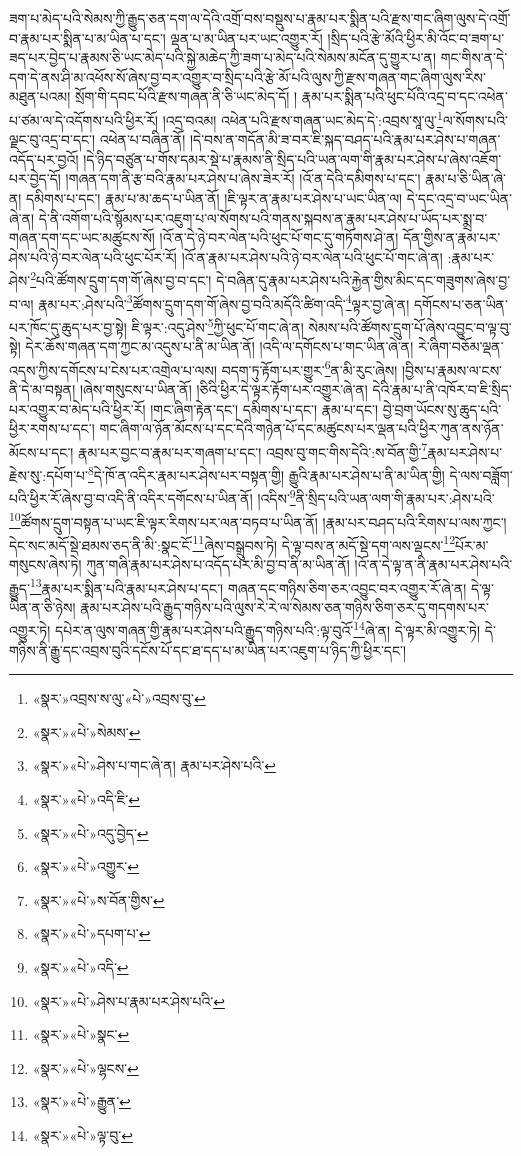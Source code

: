 ཟག་པ་མེད་པའི་སེམས་ཀྱི་རྒྱུད་ཅན་དག་ལ་དེའི་འགྲོ་བས་བསྡུས་པ་རྣམ་པར་སྨིན་པའི་རྫས་གང་ཞིག་ལུས་དེ་འགྲོ་བ་རྣམ་པར་སྨིན་པ་མ་ཡིན་པ་དང་། ལྡན་པ་མ་ཡིན་པར་ཡང་འགྱུར་རོ། །སྲིད་པའི་རྩེ་མོའི་ཕྱིར་མི་འོང་བ་ཟག་པ་ཟད་པར་བྱེད་པ་རྣམས་ཅི་ཡང་མེད་པའི་སྐྱེ་མཆེད་ཀྱི་ཟག་པ་མེད་པའི་སེམས་མངོན་དུ་གྱུར་པ་ན། གང་གིས་ན་དེ་དག་དེ་ནས་ཤི་མ་འཕོས་སོ་ཞེས་བྱ་བར་འགྱུར་བ་སྲིད་པའི་རྩེ་མོ་པའི་ལུས་ཀྱི་རྫས་གཞན་གང་ཞིག་ལུས་རིས་མཐུན་པའམ། སྲོག་གི་དབང་པོའི་རྫས་གཞན་ནི་ཅི་ཡང་མེད་དོ། །
རྣམ་པར་སྨིན་པའི་ཕུང་པོའི་འདྲ་བ་དང་འཕེན་པ་ཙམ་ལ་དེ་འདོགས་པའི་ཕྱིར་རོ། །འདྲ་བའམ། འཕེན་པའི་རྫས་གཞན་ཡང་མེད་དེ་:འབྲས་སཱ་ལུ་\footnote{«སྣར་»འབྲས་ས་ལུ་«པེ་»འབྲས་བུ་}ལ་སོགས་པའི་ལྗང་བུ་འདྲ་བ་དང་། འཕེན་པ་བཞིན་ནོ། །དེ་བས་ན་གདོན་མི་ཟ་བར་ཇི་སྐད་བཤད་པའི་རྣམ་པར་ཤེས་པ་གཞན་འདོད་པར་བྱའོ། །དེ་ཉིད་བཙུན་པ་གོས་དམར་སྡེ་པ་རྣམས་ནི་སྲིད་པའི་ཡན་ལག་གི་རྣམ་པར་ཤེས་པ་ཞེས་འཇོག་པར་བྱེད་དོ། །གཞན་དག་ནི་རྩ་བའི་རྣམ་པར་ཤེས་པ་ཞེས་ཟེར་རོ། །འོ་ན་དེའི་དམིགས་པ་དང་། རྣམ་པ་ཅི་ཡིན་ཞེ་ན། དམིགས་པ་དང་། རྣམ་པ་མ་ཆད་པ་ཡིན་ནོ། །ཇི་ལྟར་ན་རྣམ་པར་ཤེས་པ་ཡང་ཡིན་ལ། དེ་དང་འདྲ་བ་ཡང་ཡིན་ཞེ་ན། དེ་ནི་འགོག་པའི་སྙོམས་པར་འཇུག་པ་ལ་སོགས་པའི་གནས་སྐབས་ན་རྣམ་པར་ཤེས་པ་ཡོད་པར་སྨྲ་བ་གཞན་དག་དང་ཡང་མཚུངས་སོ། །འོ་ན་དེ་ཉེ་བར་ལེན་པའི་ཕུང་པོ་གང་དུ་གཏོགས་ཤེ་ན། དོན་གྱིས་ན་རྣམ་པར་ཤེས་པའི་ཉེ་བར་ལེན་པའི་ཕུང་པོར་རོ། །འོ་ན་རྣམ་པར་ཤེས་པའི་ཉེ་བར་ལེན་པའི་ཕུང་པོ་གང་ཞེ་ན། :རྣམ་པར་ཤེས་\footnote{«སྣར་»«པེ་»སེམས་}པའི་ཚོགས་དྲུག་དག་གོ་ཞེས་བྱ་བ་དང་། དེ་བཞིན་དུ་རྣམ་པར་ཤེས་པའི་རྐྱེན་གྱིས་མིང་དང་གཟུགས་ཞེས་བྱ་བ་ལ། རྣམ་པར་:ཤེས་པའི་\footnote{«སྣར་»«པེ་»ཤེས་པ་གང་ཞེ་ན། རྣམ་པར་ཤེས་པའི་}ཚོགས་དྲུག་དག་གོ་ཞེས་བྱ་བའི་མདོའི་ཚིག་འདི་\footnote{«སྣར་»«པེ་»འདི་ཇི་}ལྟར་བྱ་ཞེ་ན། དགོངས་པ་ཅན་ཡིན་པར་ཁོང་དུ་ཆུད་པར་བྱ་སྟེ། ཇི་ལྟར་:འདུ་ཤེས་\footnote{«སྣར་»«པེ་»འདུ་བྱེད་}ཀྱི་ཕུང་པོ་གང་ཞེ་ན། སེམས་པའི་ཚོགས་དྲུག་པོ་ཞེས་འབྱུང་བ་ལྟ་བུ་སྟེ། དེར་ཆོས་གཞན་དག་ཀྱང་མ་འདུས་པ་ནི་མ་ཡིན་ནོ། །འདི་ལ་དགོངས་པ་གང་ཡིན་ཞེ་ན། རེ་ཞིག་བཅོམ་ལྡན་འདས་ཀྱིས་དགོངས་པ་ངེས་པར་འགྲེལ་པ་ལས། བདག་ཏུ་རྟོག་པར་གྱུར་\footnote{«སྣར་»«པེ་»འགྱུར་}ན་མི་རུང་ཞེས། །བྱིས་པ་རྣམས་ལ་ངས་ནི་དེ་མ་བསྟན། །ཞེས་གསུངས་པ་ཡིན་ནོ། །ཅིའི་ཕྱིར་དེ་ལྟར་རྟོག་པར་འགྱུར་ཞེ་ན། དེའི་རྣམ་པ་ནི་འཁོར་བ་ཇི་སྲིད་པར་འགྱུར་བ་མེད་པའི་ཕྱིར་རོ། །གང་ཞིག་རྟེན་དང་། དམིགས་པ་དང་། རྣམ་པ་དང་། བྱེ་བྲག་ཡོངས་སུ་ཆུད་པའི་ཕྱིར་རགས་པ་དང་། གང་ཞིག་ལ་ཉོན་མོངས་པ་དང་དེའི་གཉེན་པོ་དང་མཚུངས་པར་ལྡན་པའི་ཕྱིར་ཀུན་ནས་ཉོན་མོངས་པ་དང་། རྣམ་པར་བྱང་བ་རྣམ་པར་གཞག་པ་དང་། འབྲས་བུ་གང་གིས་དེའི་:ས་བོན་གྱི་\footnote{«སྣར་»«པེ་»ས་བོན་གྱིས་}རྣམ་པར་ཤེས་པ་རྗེས་སུ་:དཔོག་པ་\footnote{«སྣར་»«པེ་»དཔག་པ་}དེ་ཁོ་ན་འདིར་རྣམ་པར་ཤེས་པར་བསྟན་གྱི། རྒྱུའི་རྣམ་པར་ཤེས་པ་ནི་མ་ཡིན་གྱི། དེ་ལས་བཟློག་པའི་ཕྱིར་རོ་ཞེས་བྱ་བ་འདི་ནི་འདིར་དགོངས་པ་ཡིན་ནོ། །འདིས་\footnote{«སྣར་»«པེ་»འདི་}ནི་སྲིད་པའི་ཡན་ལག་གི་རྣམ་པར་:ཤེས་པའི་\footnote{«སྣར་»«པེ་»ཤེས་པ་རྣམ་པར་ཤེས་པའི་}ཚོགས་དྲུག་བསྟན་པ་ཡང་ཇི་ལྟར་རིགས་པར་ལན་བཏབ་པ་ཡིན་ནོ། །རྣམ་པར་བཤད་པའི་རིགས་པ་ལས་ཀྱང་། དེང་སང་མདོ་སྡེ་ཐམས་ཅད་ནི་མི་:སྣང་ངོ་\footnote{«སྣར་»«པེ་»སྣང་}ཞེས་བསྒྲུབས་ཏེ། དེ་ལྟ་བས་ན་མདོ་སྡེ་དག་ལས་ལྡངས་\footnote{«སྣར་»«པེ་»ལྷངས་}པོར་མ་གསུངས་ཞེས་ཏེ། ཀུན་གཞི་རྣམ་པར་ཤེས་པ་འདོད་པར་མི་བྱ་བ་ནི་མ་ཡིན་ནོ། །འོ་ན་དེ་ལྟ་ན་ནི་རྣམ་པར་ཤེས་པའི་རྒྱུད་\footnote{«སྣར་»«པེ་»རྒྱུན་}རྣམ་པར་སྨིན་པའི་རྣམ་པར་ཤེས་པ་དང་། གཞན་དང་གཉིས་ཅིག་ཅར་འབྱུང་བར་འགྱུར་རོ་ཞེ་ན། དེ་ལྟ་ཡིན་ན་ཅི་ཉེས། རྣམ་པར་ཤེས་པའི་རྒྱུད་གཉིས་པའི་ལུས་རེ་རེ་ལ་སེམས་ཅན་གཉིས་ཅིག་ཅར་དུ་གདགས་པར་འགྱུར་ཏེ། དཔེར་ན་ལུས་གཞན་གྱི་རྣམ་པར་ཤེས་པའི་རྒྱུད་གཉིས་པའི་:ལྟ་བུའོ་\footnote{«སྣར་»«པེ་»ལྟ་བུ་}ཞེ་ན། དེ་ལྟར་མི་འགྱུར་ཏེ། དེ་གཉིས་ནི་རྒྱུ་དང་འབྲས་བུའི་དངོས་པོ་དང་ཐ་དད་པ་མ་ཡིན་པར་འཇུག་པ་ཉིད་ཀྱི་ཕྱིར་དང་། 